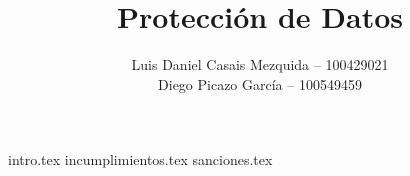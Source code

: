 \documentclass[es]{uc3mreport}
\author{
    Luis Daniel Casais Mezquida -- 100429021\\
    Diego Picazo García -- 100549459
}
\title{Protección de Datos}
\begin{document}
    \makecover


    \begin{report}

        {intro.tex}
        {incumplimientos.tex}
        {sanciones.tex}

    \end{report}

    \label{bibliography}
    \printbibliography[title={Referencias}]
\end{document}
